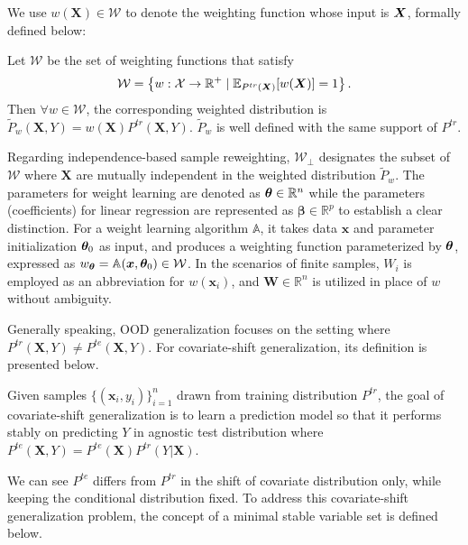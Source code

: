 We use $w(\boldsymbol{X})\in \mathcal{W}$ to denote the weighting function whose input is $\boldsymbol{X}$, formally defined below:
\begin{definition}  \label{def:weighting}
    Let $\mathcal{W}$ be the set of weighting functions that satisfy
    \begin{equation}
    \small
        \mathcal{W} = \left\{w: \mathcal{X} \rightarrow \mathbb{R}^{+} \mid \mathbb{E}_{P^{tr}(\boldsymbol{X})}[w(\boldsymbol{X})] = 1 \right\}.
    \end{equation}
    Then $\forall w \in \mathcal{W}$, the corresponding weighted distribution is $\tilde{P}_w(\boldsymbol{X}, Y) = w(\boldsymbol{X})P^{tr}(\boldsymbol{X}, Y)$. $\tilde{P}_w$ is well defined with the same support of $P^{tr}$.
\end{definition}
Regarding independence-based sample reweighting, $\mathcal{W}_{\perp}$ designates the subset of $\mathcal{W}$ where $\boldsymbol{X}$ are mutually independent in the weighted distribution $\tilde{P}_w$.
The parameters for weight learning are denoted as $\boldsymbol{\theta}\in \mathbb{R}^n$ while the parameters (coefficients) for linear regression are represented as $\boldsymbol{\beta}\in \mathbb{R}^p$ to establish a clear distinction. 
For a weight learning algorithm $\mathbb{A}$, it takes data $\boldsymbol{x}$ and parameter initialization $\boldsymbol{\theta}_0$ as input, and produces a weighting function parameterized by $\boldsymbol{\theta}$, expressed as $w_{\boldsymbol{\theta}}=\mathbb{A}(\boldsymbol{x},\boldsymbol{\theta}_0)\in \mathcal{W}$. 
In the scenarios of finite samples, $W_i$ is employed as an abbreviation for $w(\boldsymbol{x}_i)$, and $\boldsymbol{W}\in \mathbb{R}^n$ is utilized in place of $w$ without ambiguity. 


Generally speaking, OOD generalization focuses on the setting where $P^{tr}(\boldsymbol{X}, Y)\neq P^{te}(\boldsymbol{X}, Y)$. For covariate-shift generalization, its definition is presented below. 



\begin{problem}
    Given samples $\{(\boldsymbol{x}_i, y_i)\}_{i=1}^{n}$ drawn from training distribution $P^{tr}$, the goal of covariate-shift generalization is to learn a prediction model so that it performs stably on predicting $Y$ in agnostic test distribution where $P^{te}(\boldsymbol{X}, Y)=P^{te}(\boldsymbol{X})P^{tr}(Y|\boldsymbol{X})$.
\end{problem}
We can see $P^{te}$ differs from $P^{tr}$ in the shift of covariate distribution only, while keeping the conditional distribution fixed. 
To address this covariate-shift generalization problem, the concept of a minimal stable variable set is defined below.

